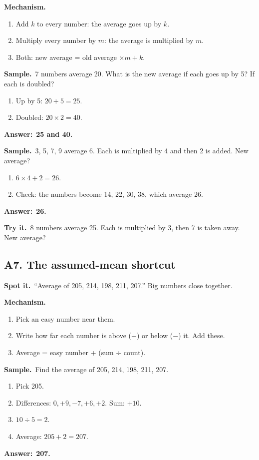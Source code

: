 \documentclass[11pt,a4paper]{article}
\let\oldsubsection\subsection
\renewcommand{\subsection}{\needspace{9\baselineskip}\oldsubsection}
\newcommand{\spot}{\textbf{\color{ember}Spot it.}\ }
\newcommand{\mech}{\textbf{\color{ember}Mechanism.}\ }
\newif\ifkeepsamp
\newcommand{\ans}[1]{\par\nopagebreak\noindent\textbf{\color{ember}Answer:}\ \textbf{#1}\par}
\newcommand{\samp}{\ifkeepsamp\needspace{4\baselineskip}\fi\textbf{\color{ember}Sample.}\ }
\newcommand{\tryit}[1]{\textbf{\color{ember}Try it.}\ #1}
\begin{document}
\mech
\begin{enumerate}
\item Add $k$ to every number: the average goes up by $k$.
\item Multiply every number by $m$: the average is multiplied by $m$.
\item Both: new average = old average $\times m + k$.
\end{enumerate}

\samp 7 numbers average 20. What is the new average if each goes up by 5? If each is doubled?
\begin{enumerate}
\item Up by 5: $20 + 5 = 25$.
\item Doubled: $20 \times 2 = 40$.
\end{enumerate}
\ans{25 and 40.}

\samp 3, 5, 7, 9 average 6. Each is multiplied by 4 and then 2 is added. New average?
\begin{enumerate}
\item $6 \times 4 + 2 = 26$.
\item Check: the numbers become 14, 22, 30, 38, which average 26.
\end{enumerate}
\ans{26.}

\tryit 8 numbers average 25. Each is multiplied by 3, then 7 is taken away. New average?

\subsection{A7. The assumed-mean shortcut}
\spot ``Average of 205, 214, 198, 211, 207.'' Big numbers close together.

\mech
\begin{enumerate}
\item Pick an easy number near them.
\item Write how far each number is above ($+$) or below ($-$) it. Add these.
\item Average = easy number + (sum $\div$ count).
\end{enumerate}

\samp Find the average of 205, 214, 198, 211, 207.
\begin{enumerate}
\item Pick 205.
\item Differences: $0, +9, -7, +6, +2$. Sum: $+10$.
\item $10 \div 5 = 2$.
\item Average: $205 + 2 = 207$.
\end{enumerate}
\ans{207.}
\end{document}
